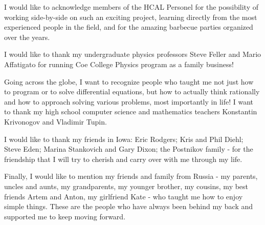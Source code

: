 I would like to acknowledge members of the HCAL Personel for the possibility of working side-by-side on such an exciting project, learning directly from the most experienced people in the field, and for the amazing barbecue parties organized over the years.

I would like to thank my undergraduate physics professors Steve Feller and Mario Affatigato for running Coe College Physics program as a family business!

Going across the globe, I want to recognize people who taught me not just how to program or to solve differential equations, but how to actually think rationally and how to approach solving various problems, most importantly in life! I want to thank my high school computer science and mathematics teachers Konstantin Krivonogov and Vladimir Tupin.

I would like to thank my friends in Iowa: Eric Rodgers; Kris and Phil Diehl; Steve Eden; Marina Stankovich and Gary Dixon; the Postnikov family - for the friendship that I will try to cherish and carry over with me through my life.

Finally, I would like to mention my friends and family from Russia - my parents, uncles and aunts, my grandparents, my younger brother, my cousins, my best friends Artem and Anton, my girlfriend Kate - who taught me how to enjoy simple things. These are the people who have always been behind my back and supported me to keep moving forward.